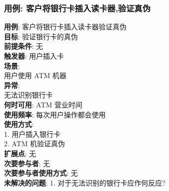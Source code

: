 \documentclass[UTF8]{article}
\begin{document}
\subsubsection{用例: 客户将银行卡插入读卡器,验证真伪}
\noindent
\textbf{用例}: 客户将银行卡插入读卡器验证真伪
\\
\textbf{目标}: 验证银行卡的真伪
\\
\textbf{前提条件}: 无
\\
\textbf{触发器}: 用户插入卡
\\
\textbf{场景}: \\
	\hspace*{2em} 用户使用 ATM 机器 \\
\textbf{异常}: \\
	\hspace*{2em} 无法识别银行卡 \\
\textbf{何时可用}: ATM 营业时间
\\
\textbf{使用频率}: 每次用户操作都会使用
\\
\textbf{使用方式}:\\
	\hspace*{2em}1. 用户插入银行卡 \\
	\hspace*{2em}2. ATM 机验证真伪 \\
\textbf{扩展点}: 无
\\
\textbf{次要参与者}: 无
\\
\textbf{次要参与者使用方式}: 无
\\
\textbf{未解决的问题}: 
	\hspace*{2em}1. 对于无法识别的银行卡应作何反应?
	
\end{document}
